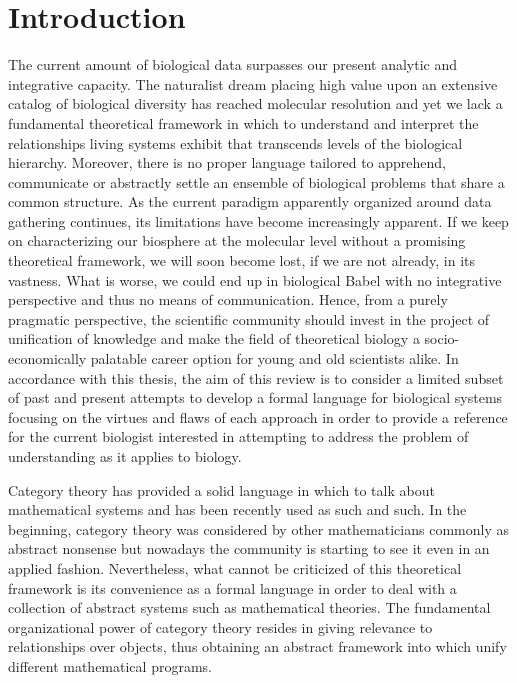 \documentclass[aps,twocolumn]{revtex4-1}
\begin{document}
\tableofcontents

\section{Introduction}

The current amount of biological data surpasses our present analytic and integrative capacity. The naturalist dream placing high value upon an extensive catalog of biological diversity has reached molecular resolution and yet we lack a fundamental theoretical framework in which to understand and interpret the relationships living systems exhibit that transcends levels of the biological hierarchy. Moreover, there is no proper language tailored to apprehend, communicate or abstractly settle an ensemble of biological problems that share a common structure. As the current paradigm apparently organized around data gathering continues, its limitations have become increasingly apparent. If we keep on characterizing our biosphere at the molecular level without a promising theoretical framework, we will soon become lost, if we are not already, in its vastness. What is worse, we could end up in biological Babel with no integrative perspective and thus no means of communication. Hence, from a purely pragmatic perspective, the scientific community should invest in the project of unification of knowledge and make the field of theoretical biology a socio-economically palatable career option for young and old scientists alike. In accordance with this thesis, the aim of this review is to consider a limited subset of past and present attempts to develop a formal language for biological systems focusing on the virtues and flaws of each approach in order to provide a reference for the current biologist interested in attempting to address the problem of understanding as it applies to biology.

Category theory has provided  a solid language in which to talk about mathematical systems and has been recently  used as such and such. In the beginning, category theory was considered by other mathematicians commonly as abstract nonsense but nowadays the community is starting to see it even in an applied fashion. Nevertheless, what cannot be criticized of this theoretical framework is its convenience as a formal language in order to deal with a collection of abstract systems such as mathematical theories. The fundamental organizational power of category theory resides in giving relevance to relationships over objects, thus obtaining an abstract framework into which unify different mathematical programs.
\end{document}
